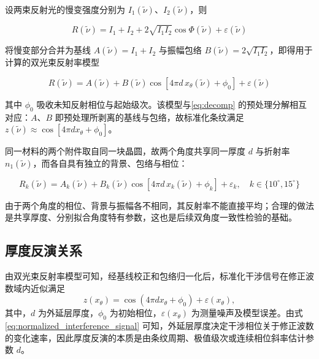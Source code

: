 \documentclass[withoutpreface,bwprint]{cumcmthesis}
\begin{document}
设两束反射光的慢变强度分别为 $I_1(\tilde\nu)$、$I_2(\tilde\nu)$，则

\begin{equation}
	R(\tilde\nu)=I_1+I_2+2\sqrt{I_1 I_2}\cos\Phi(\tilde\nu)+\varepsilon(\tilde\nu)
	\label{eq:Rraw}
\end{equation}

将慢变部分合并为基线 $A(\tilde\nu)=I_1+I_2$ 与振幅包络 $B(\tilde\nu)=2\sqrt{I_1 I_2}$，即得用于计算的双光束反射率模型

\begin{equation}
	R(\tilde\nu)=A(\tilde\nu)+B(\tilde\nu)\cos\!\left[4\pi d\,x_\theta(\tilde\nu)+\phi_0\right]+\varepsilon(\tilde\nu)
	\label{eq:twobeam}
\end{equation}

其中 $\phi_0$ 吸收未知反射相位与起始级次。该模型与\cref{eq:decomp} 的预处理分解相互对应：$A$、$B$ 即预处理所剥离的基线与包络，故标准化条纹满足 $z(\tilde\nu)\approx\cos[4\pi d x_\theta+\phi_0]$。

同一材料的两个附件取自同一块晶圆，故两个角度共享同一厚度 $d$ 与折射率 $n_1(\tilde\nu)$，而各自具有独立的背景、包络与相位：

\begin{equation}
	R_k(\tilde\nu)=A_k(\tilde\nu)+B_k(\tilde\nu)\cos\!\left[4\pi d\,x_k(\tilde\nu)+\phi_k\right]+\varepsilon_k,\quad k\in\{10^\circ,15^\circ\}
	\label{eq:shared}
\end{equation}

由于两个角度的相位、背景与振幅各不相同，其反射率不能直接平均；合理的做法是共享厚度、分别拟合角度特有参数，这也是后续双角度一致性检验的基础。

\subsection{厚度反演关系}
\label{subsec:thickness_inversion_relation}

由双光束反射率模型可知，经基线校正和包络归一化后，标准化干涉信号在修正波数域内近似满足
\begin{equation}
	z(x_\theta)
	=
	\cos\!\left(
	4\pi d x_\theta+\phi_0
	\right)
	+
	\varepsilon(x_\theta),
	\label{eq:normalized_interference_signal}
\end{equation}
其中，$d$ 为外延层厚度，$\phi_0$ 为初始相位，$\varepsilon(x_\theta)$ 为测量噪声及模型误差。由式 \eqref{eq:normalized_interference_signal} 可知，外延层厚度决定干涉相位关于修正波数的变化速率，因此厚度反演的本质是由条纹周期、极值级次或连续相位斜率估计参数 $d$。
\end{document}
